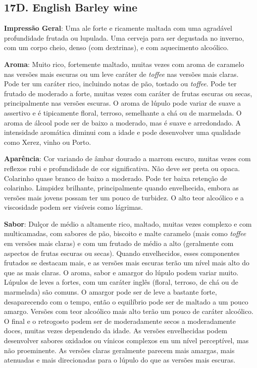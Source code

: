 \subsection*{17D. English Barley wine}
\textbf{Impressão Geral}: Uma ale forte e ricamente maltada com uma agradável profundidade frutada ou lupulada. Uma cerveja para ser degustada no inverno, com um corpo cheio, denso (com dextrinas), e com aquecimento alcoólico.

\textbf{Aroma}: Muito rico, fortemente maltado, muitas vezes com aroma de caramelo nas versões mais escuras ou um leve caráter de \textit{toffee} nas versões mais claras. Pode ter um caráter rico, incluindo notas de pão, tostado ou \textit{toffee}. Pode ter frutado de moderado a forte, muitas vezes com caráter de frutas escuras ou secas, principalmente nas versões escuras. O aroma de lúpulo pode variar de suave a assertivo e é tipicamente floral, terroso, semelhante a chá ou de marmelada. O aroma de álcool pode ser de baixo a moderado, mas é suave e arredondado. A intensidade aromática diminui com a idade e pode desenvolver uma qualidade como Xerez, vinho ou Porto.

\textbf{Aparência}: Cor variando de âmbar dourado a marrom escuro, muitas vezes com reflexos rubi e profundidade de cor significativa. Não deve ser preta ou opaca. Colarinho quase branco de baixo a moderado. Pode ter baixa retenção de colarinho. Limpidez brilhante, principalmente quando envelhecida, embora as versões mais jovens possam ter um pouco de turbidez. O alto teor alcoólico e a viscosidade podem ser visíveis como lágrimas.

\textbf{Sabor}: Dulçor de médio a altamente rico, maltado, muitas vezes complexo e com multicamadas, com sabores de pão, biscoito e malte caramelo (mais como \textit{toffee} em versões mais claras) e com um frutado de médio a alto (geralmente com aspectos de frutas escuras ou secas). Quando envelhecidos, esses componentes frutados se destacam mais, e as versões mais escuras terão um nível mais alto do que as mais claras. O aroma, sabor e amargor do lúpulo podem variar muito. Lúpulos de leves a fortes, com um caráter inglês (floral, terroso, de chá ou de marmelada) são comuns. O amargor pode ser de leve a bastante forte, desaparecendo com o tempo, então o equilíbrio pode ser de maltado a um pouco amargo. Versões com teor alcoólico mais alto terão um pouco de caráter alcoólico. O final e o retrogosto podem ser de moderadamente secos a moderadamente doces, muitas vezes dependendo da idade. As versões envelhecidas podem desenvolver sabores oxidados ou vínicos complexos em um nível perceptível, mas não proeminente. As versões claras geralmente parecem mais amargas, mais atenuadas e mais direcionadas para o lúpulo do que as versões mais escuras.

